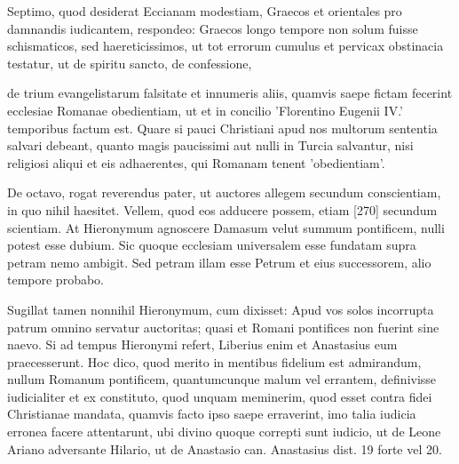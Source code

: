 Septimo, quod desiderat Eccianam modestiam, Graecos et orientales pro damnandis iudicantem, respondeo: Graecos longo tempore non solum fuisse schismaticos, sed haereticissimos, ut tot errorum cumulus et pervicax obstinacia testatur, ut de spiritu sancto, de confessione,

de trium evangelistarum falsitate et innumeris aliis, quamvis saepe fictam fecerint ecclesiae Romanae obedientiam, ut et in concilio 'Florentino Eugenii IV.' temporibus factum est. Quare si pauci Christiani apud nos multorum sententia salvari debeant, quanto magis paucissimi aut nulli in Turcia salvantur, nisi religiosi aliqui et eis adhaerentes, qui Romanam tenent 'obedientiam'.

De octavo, rogat reverendus pater, ut auctores allegem secundum conscientiam, in quo nihil haesitet. Vellem, quod eos adducere possem, etiam [270] secundum scientiam. At Hieronymum agnoscere Damasum velut summum pontificem, nulli potest esse dubium. Sic quoque ecclesiam universalem esse fundatam supra petram nemo ambigit. Sed petram illam esse Petrum et eius successorem, alio tempore probabo.

Sugillat tamen nonnihil Hieronymum, cum dixisset: Apud vos solos incorrupta patrum omnino servatur auctoritas; quasi et Romani pontifices non fuerint sine naevo. Si ad tempus Hieronymi refert, Liberius enim et Anastasius eum praecesserunt. Hoc dico, quod merito in mentibus fidelium est admirandum, nullum Romanum pontificem, quantumcunque malum vel errantem, definivisse iudicialiter et ex constituto, quod unquam meminerim, quod esset contra fidei Christianae mandata, quamvis facto ipso saepe erraverint, imo talia iudicia erronea facere attentarunt, ubi divino quoque correpti sunt iudicio, ut de Leone Ariano adversante Hilario, ut de Anastasio can. Anastasius dist. 19 forte vel 20.

